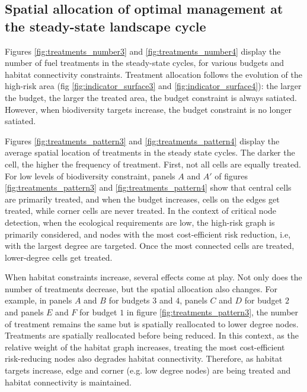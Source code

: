 

\subsection{Spatial allocation of optimal management at the steady-state landscape cycle}
Figures \ref{fig:treatments_number3} and \ref{fig:treatments_number4} display the number of fuel treatments in the steady-state cycles, for various budgets and habitat connectivity constraints. 
Treatment allocation follows the evolution of the high-risk area (fig \ref{fig:indicator_surface3} and \ref{fig:indicator_surface4}): the larger the budget, the larger the treated area, the budget constraint is always satiated. However, when biodiversity targets increase, the budget constraint is no longer satiated.

Figures \ref{fig:treatments_pattern3} and \ref{fig:treatments_pattern4} display the average spatial location of treatments in the steady state cycles. The darker the cell, the higher the frequency of treatment. First, not all cells are equally treated. For low levels of biodiversity constraint, panels $A$ and $A'$ of figures \ref{fig:treatments_pattern3} and \ref{fig:treatments_pattern4} show that central cells are primarily treated, and when the budget increases, cells on the edges get treated, while corner cells are never treated. In the context of critical node detection, when the ecological requirements are low, the high-risk graph is primarily considered, and nodes with the most cost-efficient risk reduction, i.e, with the largest degree are targeted. Once the most connected cells are treated, lower-degree cells get treated. 

When habitat constraints increase, several effects come at play. Not only does the number of treatments decrease, but the spatial allocation also changes. For example, in panels $A$ and $B$ for budgets $3$ and $4$, panels $C$ and $D$ for budget $2$ and panels $E$ and $F$ for budget $1$ in figure \ref{fig:treatments_pattern3}, the number of treatment remains the same but is spatially reallocated to lower degree nodes. Treatments are spatially reallocated before being reduced. In this context, as the relative weight of the habitat graph increases, treating the most cost-efficient risk-reducing nodes also degrades habitat connectivity. Therefore, as habitat targets increase, edge and corner (e.g. low degree nodes) are being treated and habitat connectivity is maintained.


